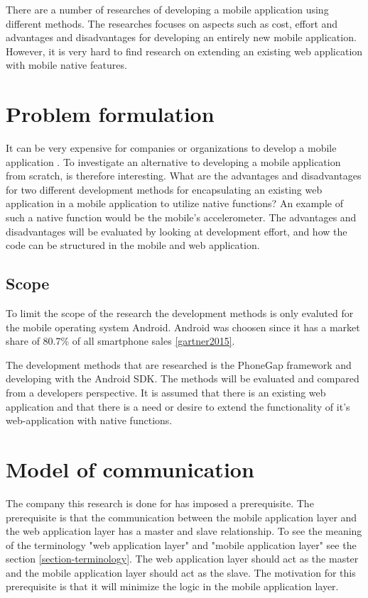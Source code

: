 There are a number of researches of developing a mobile application using different methods. The researches focuses on aspects such as cost, effort and advantages and disadvantages for developing an entirely new mobile application. However, it is very hard to find research on extending an existing web application with mobile native features. 

\section{Problem formulation}\label{sec:problem-formulation}
It can be very expensive for companies or organizations to develop a mobile application \cite{kohan2015}. To investigate an alternative to developing a mobile application from scratch, is therefore interesting.
What are the advantages and disadvantages for two different development methods for encapsulating an existing web application in a mobile application to utilize native functions? An example of such a native function would be the mobile's accelerometer. The advantages and disadvantages will be evaluated by looking at development effort, and how the code can be structured in the mobile and web application. 

\subsection{Scope} \label{subsec:scope}
To limit the scope of the research the development methods is only evaluted for the mobile operating system Android. Android was choosen since it has a market share of 80.7\% of all smartphone sales \ref{gartner2015}.

The development methods that are researched is the PhoneGap framework and developing with the Android SDK. The methods will be evaluated and compared from a developers perspective. It is assumed that there is an existing web application and that there is a need or desire to extend the functionality of it's web-application with native functions.

\section{Model of communication}\label{sec:model-of-communication}
The company this research is done for has imposed a prerequisite. The prerequisite is that the communication between the mobile application layer and the web application layer has a master and slave relationship. To see the meaning of the terminology "web application layer" and "mobile application layer" see the section \ref{section-terminology}. The web application layer should act as the master and the mobile application layer should act as the slave. The motivation for this prerequisite is that it will minimize the logic in the mobile application layer. 

